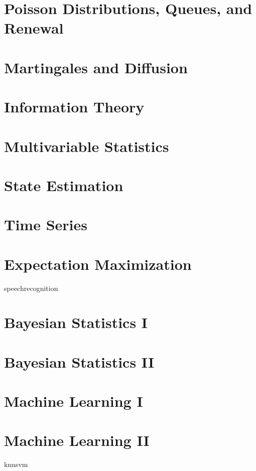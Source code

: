 \documentclass[nociteref]{newsiambook}
\begin{document}
\part{Poisson Distributions, Queues, and Renewal}

\part{Martingales and Diffusion}

\part{Information Theory}

\part{Multivariable Statistics}

\part{State Estimation}

\part{Time Series}

\part{Expectation Maximization}
{speechrecognition}

\part{Bayesian Statistics I}

\part{Bayesian Statistics II}

\part{Machine Learning I}

\part{Machine Learning II}
{knnsvm}
\end{document}
